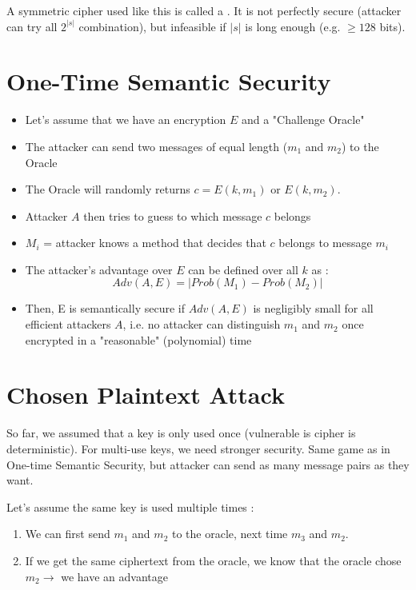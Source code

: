 A symmetric cipher used like this is called a . It is not perfectly secure (attacker can try all $2^{|s|}$ combination), but infeasible if $|s|$ is long enough (e.g. $\geq 128$ bits).

\section{One-Time Semantic Security}

\begin{itemize}
    \item Let's assume that we have an encryption $E$ and a "Challenge Oracle"
    \item The attacker can send two messages of equal length ($m_1$ and $m_2$) to the Oracle
    \item The Oracle will randomly returns $c = E(k, m_1)$ or $E(k, m_2)$.
    \item Attacker $A$ then tries to guess to which message $c$ belongs
    \item $M_i$ = attacker knows a method that decides that $c$ belongs to message $m_i$
    \item The attacker's advantage over $E$ can be defined over all $k$ as :
    \begin{equation*}
        Adv(A, E) = |Prob(M_1) - Prob(M_2)|
    \end{equation*}
    \item Then, E is semantically secure if $Adv(A, E)$ is negligibly small for all efficient attackers $A$, i.e. no attacker can distinguish $m_1$ and $m_2$ once encrypted in a "reasonable" (polynomial) time
\end{itemize}

\section{Chosen Plaintext Attack}

So far, we assumed that a key is only used once (vulnerable is cipher is deterministic). For multi-use keys, we need stronger security. Same game as in One-time Semantic Security, but attacker can send as many message pairs as they want.

Let's assume the same key is used multiple times :
\begin{enumerate}
    \item We can first send $m_1$ and $m_2$ to the oracle, next time $m_3$ and $m_2$.
    \item If we get the same ciphertext from the oracle, we know that the oracle chose $m_2 \rightarrow$ we have an advantage
\end{enumerate}

